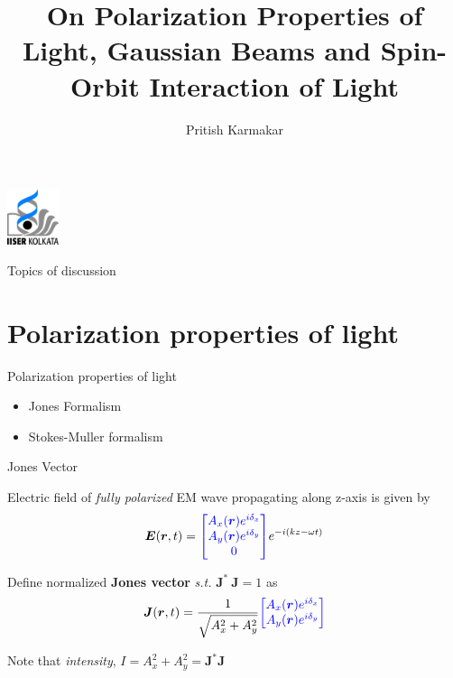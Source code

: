 \documentclass[12pt, dvipsnames]{beamer}
\author{Pritish Karmakar}
\title{{On Polarization Properties of Light,
	Gaussian Beams and Spin-Orbit Interaction of Light}}
\numberwithin{equation}{section}
\begin{document}
\begin{frame}
	\maketitle
	\centering
	\includegraphics[width=1.5cm]{iiserk.png}
\end{frame}
	
\begin{frame}{Topics of discussion}
	\tableofcontents
\end{frame}

\section{Polarization properties of light}

\begin{frame}
	\centering
	\alert{\huge Polarization properties of light}
	\begin{itemize}\Large
		\item<1>Jones Formalism
		\item<0>Stokes-Muller formalism
	\end{itemize}
\end{frame}

\begin{frame}{Jones Vector}

	Electric field of \textit{fully polarized} EM wave propagating along z-axis is given by
	\begin{align*}
		\boldsymbol{E}(\boldsymbol{r},t)=
		{\color{blue}\begin{bmatrix}
			A_x(\boldsymbol{r})e^{i\delta_x}\\
			A_y(\boldsymbol{r})e^{i\delta_y}\\
			0
		\end{bmatrix}}e^{-i(kz-\omega t)}
	\end{align*}\pause

	Define normalized \textbf{Jones vector} \textit{s.t.} $\boldsymbol{J}^\ast\:\boldsymbol{J}=1$  as
	\begin{align*}
		\boldsymbol{J}(\boldsymbol{r},t)=\frac{1}{\sqrt{A_x^2+A_y^2}}
		{\color{blue}\begin{bmatrix}
			A_x(\boldsymbol{r})e^{i\delta_x}\\
			A_y(\boldsymbol{r})e^{i\delta_y}
		\end{bmatrix}}
	\end{align*}\pause

Note that \textit{intensity}, $I= A_x^2+A_y^2 =  \boldsymbol{J}^\ast \boldsymbol{J}$
\end{frame}
\end{document}
